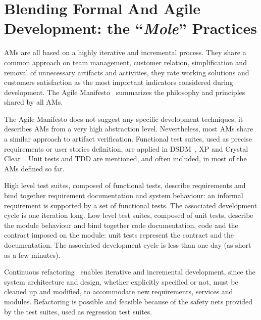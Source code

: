 \documentclass[english]{lni}
\newcommand{\mole}{``\emph{Mole}''\xspace}
\begin{document}
\section{Blending Formal And Agile Development: the \mole Practices}
\label{sec:blending_formal_and_agile_development}

AMs are all based on a highly iterative and incremental process.
They share a common approach on team management, customer relation, simplification and removal of unnecessary artifacts and activities, they rate working solutions and customers satisfaction as the most important indicators considered during development.
The Agile Manifesto~\cite{Beck2001} summarizes the philosophy and principles shared by all AMs.

The Agile Manifesto does not suggest any specific development techniques, it describes AMs from a very high abstraction level.
Nevertheless, most AMs share a similar approach to artifact verification.
Functional test suites, used as precise requirements or user stories definition, are applied in DSDM~\cite{Stapleton1997}, XP and Crystal Clear~\cite{Cockburn2004}. 
Unit tests and TDD are mentioned, and often included, in most of the AMs defined so far.

High level test suites, composed of functional tests, describe requirements and bind together requirement documentation and system behaviour: an informal requirement is supported by a set of functional tests. 
The associated development cycle is one iteration long. 
Low level test suites, composed of unit tests, describe the module behaviour and bind together code documentation, code and the contract imposed on the module: unit tests represent the contract and the documentation. 
The associated development cycle is less than one day (as short as a few minutes).

Continuous refactoring~\cite{Fowler1999} enables iterative and incremental development, since the system architecture and design, whether explicitly specified or not, must be cleaned up and modified, to accommodate new requirements, services and modules.
Refactoring is possible and feasible because of the safety nets provided by the test suites, used as regression test suites.

\end{document}
